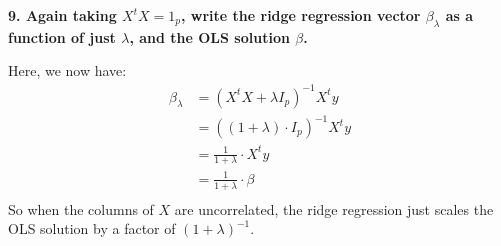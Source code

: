 \documentclass[12pt,hidelinks]{article}
\numberwithin{equation}{section}
\begin{document}
\vspace*{12pt}

\textbf{9. Again taking $X^t X = 1_p$, write the ridge regression vector
$\beta_\lambda$ as a function of just $\lambda$, and the OLS solution $\beta$.}

\vspace*{12pt}

Here, we now have:
\begin{align}
\beta_\lambda &= (X^t X + \lambda I_p)^{-1} X^t y\\
&= ((1 + \lambda) \cdot I_p)^{-1} X^t y \\
&= \frac{1}{1+\lambda} \cdot X^t y \\
&= \frac{1}{1+\lambda} \cdot \beta \\
\end{align}
So when the columns of $X$ are uncorrelated, the ridge regression just scales
the OLS solution by a factor of $(1 + \lambda)^{-1}$.
\end{document}
